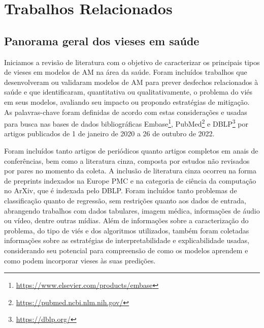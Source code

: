 \chapter{Trabalhos Relacionados}



\section{Panorama geral dos vieses em saúde}\label{sec:panorama}

Iniciamos a revisão de literatura com o objetivo de caracterizar os principais tipos de vieses em modelos de AM na área da saúde. Foram incluídos trabalhos que desenvolveram ou validaram modelos de AM para prever desfechos relacionados à saúde e que identificaram, quantitativa ou qualitativamente, o problema do viés em seus modelos, avaliando seu impacto ou propondo estratégias de mitigação. As palavras-chave foram definidas de acordo com estas considerações e usadas para busca
nas bases de dados bibliográficas Embase\footnote{\url{https://www.elsevier.com/products/embase}}, PubMed\footnote{\url{https://pubmed.ncbi.nlm.nih.gov/}} e DBLP\footnote{\url{https://dblp.org/}} por artigos publicados de 1 de janeiro de 2020 a 26 de outubro de 2022. %

Foram incluídos tanto artigos de periódicos quanto artigos completos em anais de conferências, bem como a literatura cinza, composta por estudos não revisados por pares no momento da coleta. A inclusão de literatura cinza ocorreu na forma de preprints indexados na Europe PMC e na categoria de ciência da computação no ArXiv,  que é indexada pelo DBLP. Foram incluídos tanto problemas de classificação quanto de regressão, sem restrições quanto aos dados de entrada, abrangendo trabalhos com dados tabulares, imagem médica, informações de áudio ou vídeo, dentre outras mídias. Além de informações sobre a caracterização do problema, do tipo de viés e dos algoritmos utilizados, também foram coletadas informações sobre as estratégias de interpretabilidade e explicabilidade usadas, considerando seu potencial para compreensão de como os modelos aprendem e como podem incorporar vieses às suas predições.

